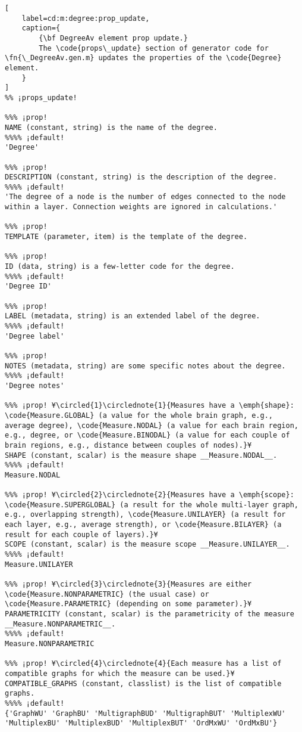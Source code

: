 \documentclass{tufte-handout}
\begin{document}
\begin{lstlisting}[
	label=cd:m:degree:prop_update,
	caption={
		{\bf DegreeAv element prop update.}
		The \code{props\_update} section of generator code for \fn{\_DegreeAv.gen.m} updates the properties of the \code{Degree} element.
	}
]
%% ¡props_update!

%%% ¡prop!
NAME (constant, string) is the name of the degree.
%%%% ¡default!
'Degree'

%%% ¡prop!
DESCRIPTION (constant, string) is the description of the degree.
%%%% ¡default!
'The degree of a node is the number of edges connected to the node within a layer. Connection weights are ignored in calculations.'

%%% ¡prop!
TEMPLATE (parameter, item) is the template of the degree.

%%% ¡prop!
ID (data, string) is a few-letter code for the degree.
%%%% ¡default!
'Degree ID'

%%% ¡prop!
LABEL (metadata, string) is an extended label of the degree.
%%%% ¡default!
'Degree label'

%%% ¡prop!
NOTES (metadata, string) are some specific notes about the degree.
%%%% ¡default!
'Degree notes'

%%% ¡prop! ¥\circled{1}\circlednote{1}{Measures have a \emph{shape}: \code{Measure.GLOBAL} (a value for the whole brain graph, e.g., average degree), \code{Measure.NODAL} (a value for each brain region, e.g., degree, or \code{Measure.BINODAL} (a value for each couple of brain regions, e.g., distance between couples of nodes).}¥
SHAPE (constant, scalar) is the measure shape __Measure.NODAL__.
%%%% ¡default!
Measure.NODAL

%%% ¡prop! ¥\circled{2}\circlednote{2}{Measures have a \emph{scope}: \code{Measure.SUPERGLOBAL} (a result for the whole multi-layer graph, e.g., overlapping strength), \code{Measure.UNILAYER} (a result for each layer, e.g., average strength), or \code{Measure.BILAYER} (a result for each couple of layers).}¥
SCOPE (constant, scalar) is the measure scope __Measure.UNILAYER__.
%%%% ¡default!
Measure.UNILAYER

%%% ¡prop! ¥\circled{3}\circlednote{3}{Measures are either \code{Measure.NONPARAMETRIC} (the usual case) or \code{Measure.PARAMETRIC} (depending on some parameter).}¥
PARAMETRICITY (constant, scalar) is the parametricity of the measure __Measure.NONPARAMETRIC__.
%%%% ¡default!
Measure.NONPARAMETRIC

%%% ¡prop! ¥\circled{4}\circlednote{4}{Each measure has a list of compatible graphs for which the measure can be used.}¥
COMPATIBLE_GRAPHS (constant, classlist) is the list of compatible graphs.
%%%% ¡default!
{'GraphWU' 'GraphBU' 'MultigraphBUD' 'MultigraphBUT' 'MultiplexWU' 'MultiplexBU' 'MultiplexBUD' 'MultiplexBUT' 'OrdMxWU' 'OrdMxBU'}


\end{lstlisting}
\end{document}
